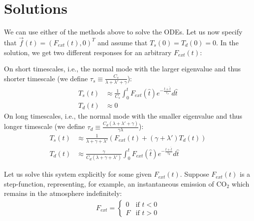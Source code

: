 \section{Solutions}\label{Dynamical Systems Solutions}
We can use either of the methods above to solve the ODEs. Let us now specify that $\vec{f}(t)=(F_{ext}(t),0)^T$ and assume that $T_s(0)=T_d(0)=0$. In the solution, we get two different responses for an arbitrary $F_{ext}(t)$:\vspace{5 mm}

\noindent On short timescales, i.e., the normal mode with the larger eigenvalue and thus shorter timescale (we define $\tau_s\equiv\frac{C_s}{\lambda+\lambda'+\gamma}$): 
\begin{align}
    T_s(t) & \approx \frac{1}{C_s}\int_0^tF_{ext}(\hat{t}) e^{-\frac{t+\hat{t}}{\tau_s}}d\hat{t} \label{T_s short soln} \\ 
    T_d(t)& \approx 0 \label{T_d short soln}
\end{align}
On long timescales, i.e., the normal mode with the smaller eigenvalue and thus longer timescale (we define $\tau_d\equiv\frac{C_d(\lambda+\lambda'+\gamma)}{\gamma\lambda}$):
\begin{align}
    T_s(t) & \approx \frac{1}{\lambda+\gamma+\lambda'}\left(F_{ext}(t)+(\gamma+\lambda ')T_d(t)\right) \\ 
    T_d(t) & \approx \frac{\gamma}{C_d(\lambda+\gamma+\lambda')}\int_0^tF_{ext}(\hat{t}) e^{-\frac{t+\hat{t}}{\tau_d}}d\hat{t}  \label{T_d long step soln}
\end{align}

Let us solve this system explicitly for some given $F_{ext}(t)$. Suppose $F_{ext}(t)$ is a step-function, representing, for example, an instantaneous emission of CO$_2$ which remains in the atmosphere indefinitely:
\begin{align*}
    F_{ext}=
    \begin{cases}
        0 & \text{if } t<0 \\
        F & \text{if } t>0
    \end{cases}
\end{align*}

